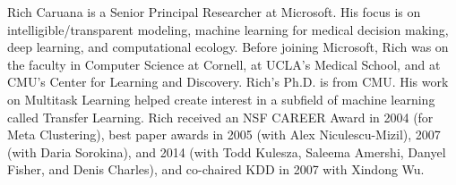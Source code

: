 Rich Caruana is a Senior Principal Researcher at Microsoft. His focus is on intelligible/transparent
modeling, machine learning for medical decision making, deep learning, and computational ecology.
Before joining Microsoft, Rich was on the faculty in Computer Science at Cornell, at UCLA’s Medical
School, and at CMU’s Center for Learning and Discovery. Rich’s Ph.D. is from CMU. His work on
Multitask Learning helped create interest in a subfield of machine learning called Transfer Learning.
Rich received an NSF CAREER Award in 2004 (for Meta Clustering), best paper awards in 2005 (with
Alex Niculescu-Mizil), 2007 (with Daria Sorokina), and 2014 (with Todd Kulesza, Saleema Amershi,
Danyel Fisher, and Denis Charles), and co-chaired KDD in 2007 with Xindong Wu.
